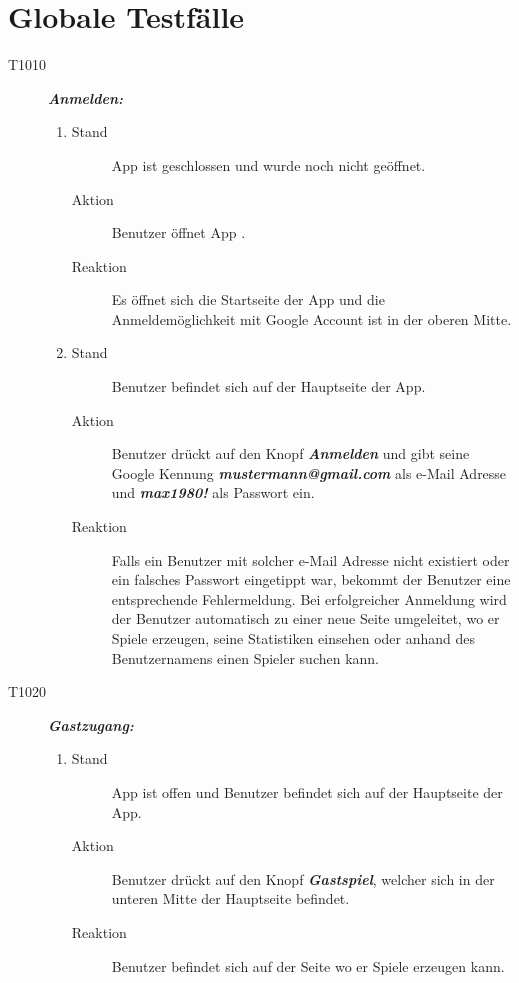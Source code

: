 \documentclass[parskip=full]{scrartcl}
\begin{document}
\section{Globale Testfälle}
\begin{description}
	\item[T1010] \textbf{\textit{Anmelden: }} \\
	\begin{enumerate}
		\item 
		\begin{description}
			\item[Stand] App ist geschlossen und wurde noch nicht geöffnet.
			\item[Aktion] Benutzer öffnet App .
			\item[Reaktion] Es öffnet sich die Startseite der App und die Anmeldemöglichkeit mit Google Account  ist in der oberen Mitte.
		\end{description} 
		\item 
		\begin{description}
			\item[Stand] Benutzer befindet sich auf der Hauptseite der App.
			\item[Aktion] Benutzer drückt auf den Knopf \textit{\textbf{Anmelden}} und gibt seine Google Kennung  \textit{\textbf{mustermann@gmail.com }}als  e-Mail Adresse und \textit{\textbf{max1980!}} als Passwort ein.
			\item[Reaktion]
			Falls ein Benutzer mit solcher e-Mail Adresse nicht existiert oder ein falsches Passwort eingetippt war, bekommt der Benutzer eine entsprechende Fehlermeldung. Bei erfolgreicher Anmeldung wird der Benutzer  automatisch zu einer neue Seite umgeleitet, wo er Spiele erzeugen, seine Statistiken einsehen oder anhand des Benutzernamens einen Spieler suchen kann.
		\end{description}
		
	\end{enumerate}
	
	\item[T1020]  \textbf{\textit{Gastzugang: }} 
	\begin{enumerate}
		\item 
		\begin{description}
			\item[Stand] App ist offen und Benutzer befindet sich auf der Hauptseite der App.
			\item[Aktion] Benutzer drückt auf den Knopf \textbf{\textit{Gastspiel}}, welcher sich in der unteren Mitte der Hauptseite befindet.
			\item[Reaktion] Benutzer befindet sich auf der Seite wo er Spiele erzeugen kann.
		\end{description} 
		

\end{enumerate}
\end{description}
\end{document}
